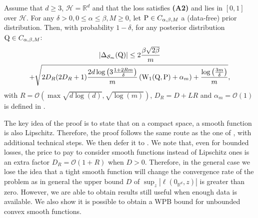 \begin{theorem}
\label{th: main_gaussian_smooth}
Assume that $d\geq 3$, $\mathcal{H}= \mathbb{R}^d$ and that the loss satisfies \textbf{(A2)} and lies in $[0,1]$ over $\mathcal{H}$. For any $\delta>0, 0\leq \alpha\leq \beta, M\geq 0$, let $\P\in C_{\alpha,\beta,M}$ a (data-free) prior distribution. Then, with probability $1-\delta$, for any posterior distribution $\Q\in C_{\alpha,\beta,M}$:
\begin{multline*}
|\Delta_{\Sm}(\Q)| \leq 2 \frac{\beta\sqrt{2\beta}}{m} \\
+ \sqrt{2D_R(2D_R+1)\frac{2d\log\left(3\frac{1 +2Rm }{\delta}\right)}{m} \left(\W_{1}(\Q,\P)+ \alpha_m \right) + \frac{\log\left( \frac{3m}{\delta} \right)}{m} },
\end{multline*}
with $R= \mathcal{O}\left( \max \sqrt{d\log(d)}, \sqrt{\log(m)}   \right)$,  $D_R= D+LR$ and $\alpha_m= \mathcal{O}(1)$ is defined in .
\end{theorem}
The key idea of the proof is to state that on a compact space, a smooth function is also Lipschitz. Therefore, the proof follows the same route as the one of , with additional technical steps. We then defer it to .
We note that, even for bounded losses, the price to pay to consider smooth functions instead of Lipschitz ones is an extra factor $D_R= \mathcal{O}(1+R)$ when $D>0$. Therefore, in the general case we lose the idea that a tight smooth function will change the convergence rate of the problem as in general the upper bound $D$ of  $\sup_{z}|\ell(0_{\mathbb{R}^d},z)|$ is greater than zero. However, we are able to obtain results still useful when enough data is available. We also show it is possible to obtain a WPB bound for unbounded convex smooth functions.

